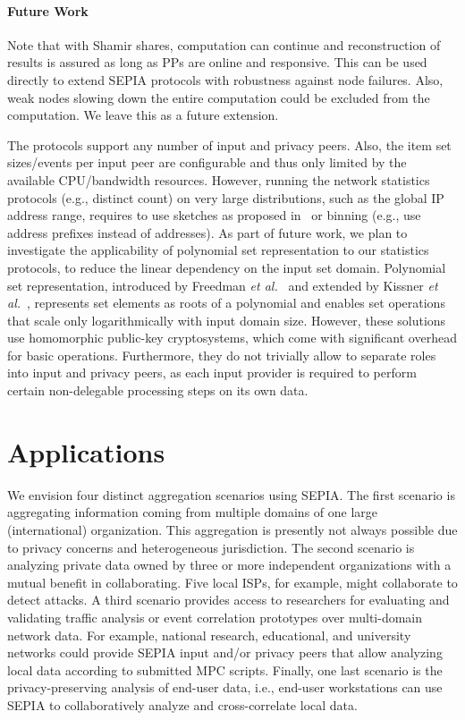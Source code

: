 \documentclass[letterpaper,11pt,onecolumn,titlepage]{article}
\begin{document}
\paragraph{Future Work}
Note that with Shamir shares, computation can continue and reconstruction of results is assured as long as  PPs are online and responsive. This can be used directly to extend SEPIA protocols with robustness against node failures. Also, weak nodes slowing down the entire computation could be excluded from the computation. We leave this as a future extension.

The protocols support any number of input and privacy
peers. Also, the item set sizes/events per input peer are configurable and thus only
limited by the available CPU/bandwidth resources. 
However, running the network statistics protocols (e.g., distinct count) on very large distributions, such as the global IP address range, requires to use sketches as proposed in~\cite{roughan2006sdd} or binning (e.g., use address prefixes instead of addresses).
As part of future work, we plan to investigate the applicability of polynomial set representation to our statistics protocols, to reduce the linear dependency on the input set domain. Polynomial set representation, introduced by Freedman \emph{et al.}~\cite{freedman2004pm} and extended by Kissner 
\emph{et al.}~\cite{kissner2005pps}, represents set elements as roots of a polynomial and enables set operations that scale only logarithmically with input domain size.
However, these solutions use homomorphic public-key cryptosystems, which come with significant overhead for basic operations. Furthermore, they do not trivially allow to separate roles into input and privacy peers, as each input provider is required to 
perform certain non-delegable processing steps on its own data.

\section{Applications}
\label{sec:applications}





We envision four distinct aggregation scenarios using SEPIA. The first
scenario is aggregating information coming from multiple domains of
one large (international) organization. This aggregation is presently
not always possible due to privacy concerns and heterogeneous jurisdiction. The
second scenario is analyzing private data owned by three or more
independent organizations with a mutual benefit in collaborating. Five
local ISPs, for example, might collaborate to detect attacks. A third
scenario provides access to researchers for evaluating and validating
traffic analysis or event correlation prototypes over multi-domain
network data. For example, national research, educational, and
university networks could provide SEPIA input and/or privacy peers that allow
analyzing local data according to submitted MPC scripts. Finally,
one last scenario is the privacy-preserving analysis of end-user data,
i.e., end-user workstations can use SEPIA to collaboratively analyze
and cross-correlate local data. 
\end{document}
